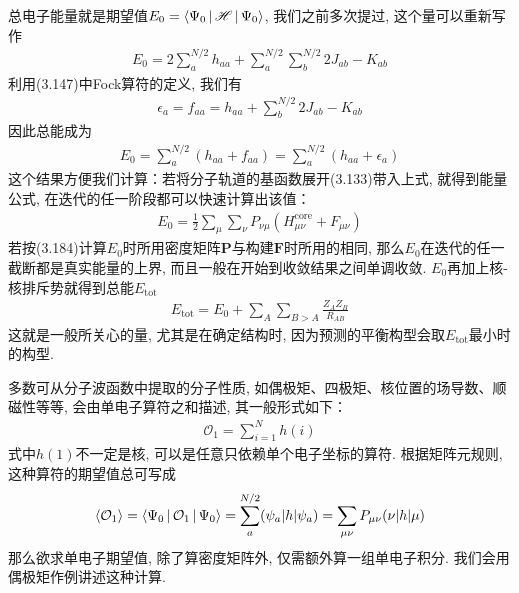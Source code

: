 总电子能量就是期望值$E_0 = \Braket{\Psi_0|\mathscr{H}|\Psi_0}$, 
我们之前多次提过, 
这个量可以重新写作
\begin{align}
	E_0 =2\sum_a^{N/2}h_{aa} + \sum_a^{N/2}\sum_b^{N/2}2J_{ab}-K_{ab}
\end{align}
利用(3.147)中Fock算符的定义, 
我们有
\begin{align}
	\epsilon_a = f_{aa} = h_{aa} + \sum_b^{N/2}2J_{ab} - K_{ab}
\end{align}
因此总能成为
\begin{align}
	E_0 = \sum_{a}^{N/2}(h_{aa}+f_{aa}) = \sum_{a}^{N/2}(h_{aa}+\epsilon_a)
\end{align}
这个结果方便我们计算：若将分子轨道的基函数展开(3.133)带入上式, 
就得到能量公式, 
在迭代的任一阶段都可以快速计算出该值：
\begin{align}
	\label{3.184}
	E_0 = \frac{1}{2}\sum_\mu\sum_\nu P_{\nu\mu}(H_{\mu\nu}^\mathrm{core}+F_{\mu\nu})
\end{align}
若按(3.184)计算$E_0$时所用密度矩阵$\mathbf{P}$与构建$\mathbf{F}$时所用的相同, 
那么$E_0$在迭代的任一截断都是真实能量的上界, 
而且一般在开始到收敛结果之间单调收敛. 
$E_0$再加上核-核排斥势就得到总能$E_\mathrm{tot}$
\begin{align}
	E_\mathrm{tot} = E_0 + \sum_{A}\sum_{B>A}\frac{Z_AZ_B}{R_{AB}}
\end{align}
这就是一般所关心的量, 
尤其是在确定结构时, 
因为预测的平衡构型会取$E_\mathrm{tot}$最小时的构型.


多数可从分子波函数中提取的分子性质, 
如偶极矩、四极矩、核位置的场导数、顺磁性等等, 
会由单电子算符之和描述, 
其一般形式如下：
\begin{align}
	\mathcal{O}_1 = \sum_{i=1}^{N}h(i)
\end{align}
式中$h(1)$不一定是核\ha, 
可以是任意只依赖单个电子坐标的算符. 
根据矩阵元规则, 
这种算符的期望值总可写成
\begin{align}
	\Braket{\mathcal{O}_1} = \Braket{\Psi_0|\mathcal{O}_1|\Psi_0} = \sum_{a}^{N/2}(\psi_a|h|\psi_a) = \sum_{\mu\nu}P_{\mu\nu}(\nu|h|\mu)
\end{align}
那么欲求单电子期望值, 
除了算密度矩阵外, 
仅需额外算一组单电子积分. 
我们会用偶极矩作例讲述这种计算. 


